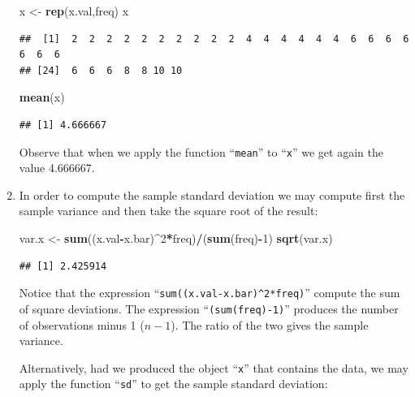 \documentclass[
]{krantz}
\makeatletter
\newenvironment{Shaded}{\begin{snugshade}}{\end{snugshade}}
\newcommand{\DecValTok}[1]{\textcolor[rgb]{0.00,0.00,0.81}{#1}}
\newcommand{\KeywordTok}[1]{\textcolor[rgb]{0.13,0.29,0.53}{\textbf{#1}}}
\newcommand{\NormalTok}[1]{#1}
\newcommand{\OperatorTok}[1]{\textcolor[rgb]{0.81,0.36,0.00}{\textbf{#1}}}
\newcommand{\StringTok}[1]{\textcolor[rgb]{0.31,0.60,0.02}{#1}}
\newenvironment{kframe}{%
\medskip{}
\setlength{\fboxsep}{.8em}
 \def\at@end@of@kframe{}%
 \ifinner\ifhmode%
  \def\at@end@of@kframe{\end{minipage}}%
  \begin{minipage}{\columnwidth}%
 \fi\fi%
 \def\FrameCommand##1{\hskip\@totalleftmargin \hskip-\fboxsep
 \colorbox{shadecolor}{##1}\hskip-\fboxsep
     \hskip-\linewidth \hskip-\@totalleftmargin \hskip\columnwidth}%
 \MakeFramed {\advance\hsize-\width
   \@totalleftmargin\z@ \linewidth\hsize
   \@setminipage}}%
 {\par\unskip\endMakeFramed%
 \at@end@of@kframe}
\renewenvironment{Shaded}{\begin{kframe}}{\end{kframe}}
\theoremstyle{definition}
\theoremstyle{definition}
\theoremstyle{definition}
\theoremstyle{remark}
\makeatother
\begin{document}
\begin{enumerate}
\begin{Shaded}
\begin{Highlighting}[]
\NormalTok{x <-}\StringTok{ }\KeywordTok{rep}\NormalTok{(x.val,freq)}
\NormalTok{x}
\end{Highlighting}
\end{Shaded}

\begin{verbatim}
##  [1]  2  2  2  2  2  2  2  2  2  2  4  4  4  4  4  4  6  6  6  6  6  6  6
## [24]  6  6  6  8  8 10 10
\end{verbatim}

\begin{Shaded}
\begin{Highlighting}[]
\KeywordTok{mean}\NormalTok{(x)}
\end{Highlighting}
\end{Shaded}

\begin{verbatim}
## [1] 4.666667
\end{verbatim}

  Observe that when we apply the function ``\texttt{mean}'' to ``\texttt{x}'' we get again
  the value 4.666667.
\item
  In order to compute the
  sample standard deviation we may compute first the sample variance and
  then take the square root of the result:

\begin{Shaded}
\begin{Highlighting}[]
\NormalTok{var.x <-}\StringTok{ }\KeywordTok{sum}\NormalTok{((x.val}\OperatorTok{-}\NormalTok{x.bar)}\OperatorTok{^}\DecValTok{2}\OperatorTok{*}\NormalTok{freq)}\OperatorTok{/}\NormalTok{(}\KeywordTok{sum}\NormalTok{(freq)}\OperatorTok{-}\DecValTok{1}\NormalTok{)}
\KeywordTok{sqrt}\NormalTok{(var.x)}
\end{Highlighting}
\end{Shaded}

\begin{verbatim}
## [1] 2.425914
\end{verbatim}

  Notice that the expression ``\texttt{sum((x.val-x.bar)\^{}2*freq)}'' compute the sum
  of square deviations. The expression ``\texttt{(sum(freq)-1)}'' produces the
  number of observations minus 1 (\(n-1\)). The ratio of the two gives the
  sample variance.

  Alternatively, had we produced the object ``\texttt{x}'' that contains the data,
  we may apply the function ``\texttt{sd}'' to get the sample standard deviation:


\end{enumerate}
\end{document}
